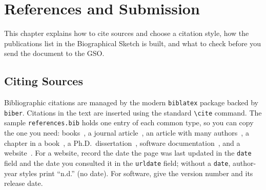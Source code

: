%

\chapter{References and Submission}
\label{ch:references}

This chapter explains how to cite sources and choose a citation style, how the publications list in the Biographical Sketch is built, and what to check before you send the document to the GSO.

\section{Citing Sources}
\label{sec:bibliography}

Bibliographic citations are managed by the modern \texttt{biblatex} package backed by \texttt{biber}. Citations in the text are inserted using the standard \verb+\cite+ command. The sample \texttt{references.bib} holds one entry of each common type, so you can copy the one you need: books~\cite{Lamport1994,Knuth1984,Mittelbach2023}, a journal article~\cite{KnuthPlass1981}, an article with many authors~\cite{Harris2020}, a chapter in a book~\cite{Halmos1973}, a Ph.D.\ dissertation~\cite{Adriazola2021}, software documentation~\cite{biblatex}, and a website~\cite{EberhardtWiki}. For a website, record the date the page was last updated in the \texttt{date} field and the date you consulted it in the \texttt{urldate} field; without a \texttt{date}, author-year styles print ``n.d.'' (no date). For software, give the version number and its release date.

